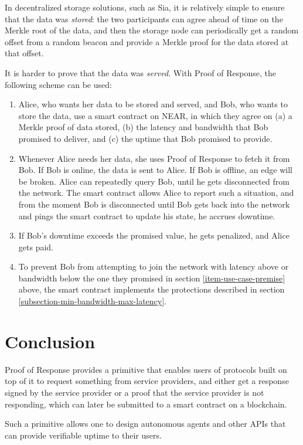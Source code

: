 \documentclass{article}
\begin{document}
In decentralized storage solutions, such as Sia, it is relatively simple to ensure that the data was \textit{stored}: the two participants can agree ahead of time on the Merkle root of the data, and then the storage node can periodically get a random offset from a random beacon and provide a Merkle proof for the data stored at that offset.

It is harder to prove that the data was \textit{served}. With Proof of Response, the following scheme can be used:

\begin{enumerate}
    \item\label{item-use-case-premise} Alice, who wants her data to be stored and served, and Bob, who wants to store the data, use a smart contract on NEAR, in which they agree on (a) a Merkle proof of data stored, (b) the latency and bandwidth that Bob promised to deliver, and (c) the uptime that Bob promised to provide.
    \item Whenever Alice needs her data, she uses Proof of Response to fetch it from Bob. If Bob is online, the data is sent to Alice. If Bob is offline, an edge will be broken. Alice can repeatedly query Bob, until he gets disconnected from the network. The smart contract allows Alice to report such a situation, and from the moment Bob is disconnected until Bob gets back into the network and pings the smart contract to update his state, he accrues downtime.
    \item If Bob's downtime exceeds the promised value, he gets penalized, and Alice gets paid.
    \item To prevent Bob from attempting to join the network with latency above or bandwidth below the one they promised in section \ref{item-use-case-premise} above, the smart contract implements the protections described in section \ref{subsection-min-bandwidth-max-latency}.
\end{enumerate}

\section{Conclusion}

Proof of Response provides a primitive that enables users of protocols built on top of it to request something from service providers, and either get a response signed by the service provider or a proof that the service provider is not responding, which can later be submitted to a smart contract on a blockchain.

Such a primitive allows one to design autonomous agents and other APIs that can provide verifiable uptime to their users.

\printbibliography
\end{document}
